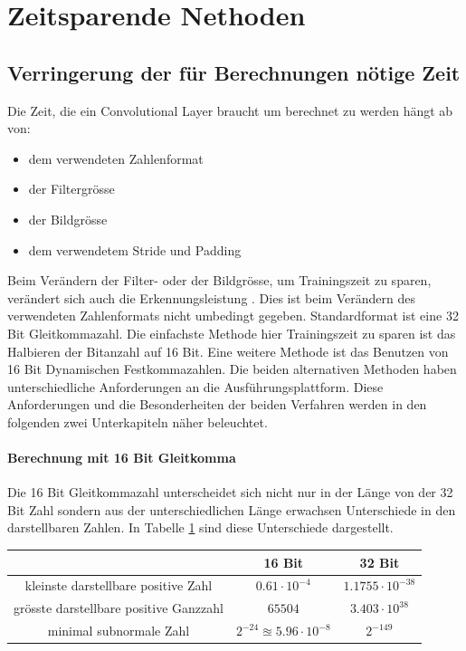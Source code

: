 \section{Zeitsparende Nethoden}
\label{sec:time}
\subsection{Verringerung der für Berechnungen nötige Zeit}\label{sec:fp16}



Die Zeit, die ein Convolutional Layer braucht um berechnet zu werden hängt ab von:
\begin{itemize}
 \item dem verwendeten Zahlenformat
 \item der Filtergr\"osse
 \item der Bildgr\"osse
 \item dem verwendetem Stride und Padding
\end{itemize}



Beim Verändern der Filter- oder der Bildgr\"osse, um Trainingszeit zu sparen, ver\"andert sich auch die Erkennungsleistung . Dies ist beim Verändern des verwendeten Zahlenformats nicht umbedingt gegeben. Standardformat ist eine 32 Bit Gleitkommazahl. Die einfachste Methode hier Trainingszeit zu sparen ist das Halbieren der Bitanzahl auf 16 Bit. Eine weitere Methode ist das Benutzen von 16 Bit Dynamischen Festkommazahlen.
Die beiden alternativen Methoden haben unterschiedliche Anforderungen an die Ausführungsplattform. Diese Anforderungen und die Besonderheiten der beiden Verfahren werden in den folgenden zwei Unterkapiteln näher beleuchtet.


\paragraph{Berechnung mit 16 Bit Gleitkomma}
\cite{ieee}
Die 16 Bit Gleitkommazahl unterscheidet sich nicht nur in der Länge von der 32 Bit Zahl sondern aus der unterschiedlichen Länge erwachsen Unterschiede in den darstellbaren Zahlen. In Tabelle \ref{tab:numbers} sind diese Unterschiede dargestellt. 

\begin{table}[H]
\label{tab:numbers}
\begin{tabular}{|c|c|c|}
\hline                                       & 16 Bit                             & 32 Bit              \\ \hline
kleinste darstellbare positive Zahl    & $0.61  \cdot 10^{-4}$              & $1.1755 \cdot 10^{-38}$ \\ \hline
grösste darstellbare positive Ganzzahl & $65504$                            & $ 3.403 \cdot 10^{38}$  \\ \hline
minimal subnormale Zahl                & $2^{-24} \approxeq 5.96 \cdot 10^{-8}$ & $ 2^{-149}$         \\ \hline
\end{tabular}
\end{table}

